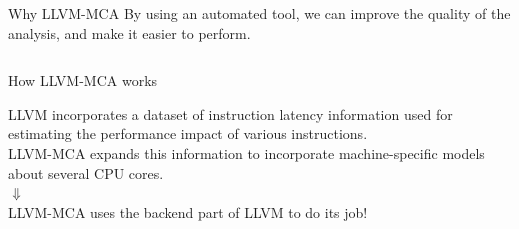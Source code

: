 \begin{frame}{Why LLVM-MCA}
By using an automated tool, we can \alert{improve} the quality of the analysis,
and make it easier to perform.\\
\medskip
\begin{columns}

\end{columns}
\end{frame}


\begin{frame}{How LLVM-MCA works}
\begin{center}
LLVM incorporates a \alert{dataset of instruction latency information} used for estimating the performance impact of various instructions.\\
\bigskip
LLVM-MCA expands this information to incorporate \alert{machine-specific models} about several CPU cores.\\
\medskip
$\Downarrow$\\
\medskip
LLVM-MCA uses the \alert{backend} part of LLVM to do its job!
\end{center}
\end{frame}









